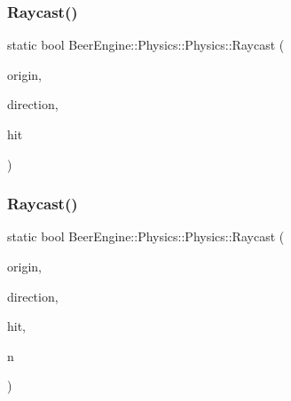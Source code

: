 \subsubsection{\texorpdfstring{Raycast()}{Raycast()}\hspace{0.1cm}{\footnotesize\ttfamily [2/3]}}
{\footnotesize\ttfamily static bool Beer\+Engine\+::\+Physics\+::\+Physics\+::\+Raycast (\begin{DoxyParamCaption}\item[{glm\+::vec3}]{origin,  }\item[{glm\+::vec3}]{direction,  }\item[{\mbox{\hyperlink{struct_beer_engine_1_1_physics_1_1_raycast_hit}{Raycast\+Hit}} \&}]{hit }\end{DoxyParamCaption})\hspace{0.3cm}{\ttfamily [static]}}

\mbox{\label{class_beer_engine_1_1_physics_1_1_physics_a2ab720f864bdb8c90ae46626c06cead9}} 
\subsubsection{\texorpdfstring{Raycast()}{Raycast()}\hspace{0.1cm}{\footnotesize\ttfamily [3/3]}}
{\footnotesize\ttfamily static bool Beer\+Engine\+::\+Physics\+::\+Physics\+::\+Raycast (\begin{DoxyParamCaption}\item[{glm\+::vec3}]{origin,  }\item[{glm\+::vec3}]{direction,  }\item[{\mbox{\hyperlink{struct_beer_engine_1_1_physics_1_1_raycast_hit}{Raycast\+Hit}} \&}]{hit,  }\item[{int}]{n }\end{DoxyParamCaption})\hspace{0.3cm}{\ttfamily [static]}}

\mbox{\label{class_beer_engine_1_1_physics_1_1_physics_a8cb427e1ed3ee30ba6abc91b4b303322}} 
